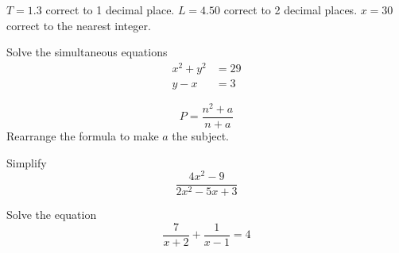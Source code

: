 \documentclass{exam}
\begin{document}
\begin{questions}
    $T=1.3$ correct to 1 decimal place. $L=4.50$ correct to 2 decimal places. $x=30$ correct to the nearest integer.

    \newpage

    \question Solve the simultaneous equations
    \begin{equation*}
        \begin{split}
            x^2+y^2&=29 \\
            y-x&=3
        \end{split}
    \end{equation*}
    \newpage

    \question $$P=\frac{n^2+a}{n+a}$$
    Rearrange the formula to make $a$ the subject.
    \newpage

    \question Simplify $$\frac{4x^2-9}{2x^2-5x+3}$$
    \newpage

    \question Solve the equation $$\frac{7}{x+2} + \frac{1}{x-1}=4$$
    \newpage


\end{questions}
\end{document}
